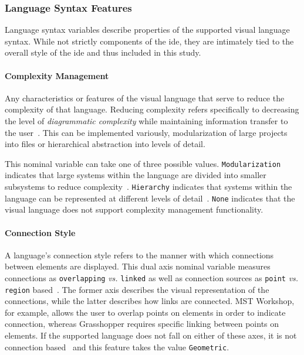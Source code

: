 \subsubsection{Language Syntax Features} \label{subsubsec:languagesyntax}

Language syntax variables describe properties of the supported visual
language syntax. While not strictly components of the \ac{ide}, they are
intimately tied to the overall style of the \ac{ide} and thus included in this
study.


\paragraph{Complexity Management}
Any characteristics or features of the
visual language that serve to reduce the complexity of that language.
Reducing complexity refers specifically to decreasing the level of
\emph{diagrammatic complexity} while maintaining information transfer to
the user~\cite{moody2009}. This can be implemented variously, \eg
modularization of large projects into files or hierarchical abstraction
into levels of detail.

This nominal variable can take one of three possible values.
\texttt{Modularization} indicates that large systems within the language
are divided into smaller subsystems to reduce complexity~\cite{moody2009}.
\texttt{Hierarchy} indicates that systems within the language can be
represented at different levels of detail~\cite{moody2009}. \texttt{None}
indicates that the visual language does not support complexity management
functionality.


\paragraph{Connection Style}
A language's connection style refers to the manner with which connections
between elements are displayed. This dual axis nominal variable measures
connections as \texttt{overlapping} \emph{vs.} \texttt{linked} as well as
connection sources as \texttt{point} \emph{vs.} \texttt{region}
based~\cite{costagliola2002}. The former axis describes the visual
representation of the connections, while the latter describes how links are
connected. MST Workshop, for example, allows the user to overlap points on
elements in order to indicate connection, whereas Grasshopper requires
specific linking between points on elements. If the supported language
does not fall on either of these axes, it is not connection
based~\cite{costagliola2002} and this feature takes the value
\texttt{Geometric}.


